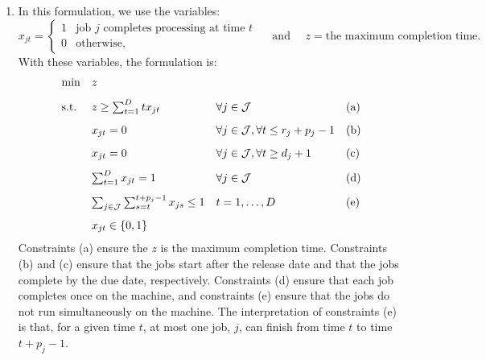 \documentclass[10pt]{article}
\begin{document}
\begin{enumerate}
\begin{enumerate}
  \item In this formulation, we use the variables:
    \[
    x_{jt} = \left\{
      \begin{array}{ll}
        1 & \mbox{job $j$ completes processing at time $t$} \\
        0 & \mbox{otherwise},
      \end{array}
      \right. \quad \mbox{ and } \quad z = \mbox{the maximum
        completion time}.
    \]
    With these variables, the formulation is:
    \[
    \begin{array}{llll}
      \min & z & & \\[3mm]
      \mbox{s.t.} & z \geq \sum_{t=1}^D t x_{jt} & \forall j \in {\cal J} &
      \mbox{(a)} \\[3mm]
      & x_{jt} = 0 & \forall j \in {\cal J}, \forall t \leq r_j + p_j - 1 &
      \mbox{(b)} \\[3mm]
      & x_{jt} = 0 & \forall j \in {\cal J}, \forall t \geq d_j + 1 &
      \mbox{(c)} \\[3mm]
      & \sum_{t=1}^D x_{jt} = 1 & \forall j \in {\cal J} & \mbox{(d)} \\[3mm]
      & \sum_{j \in {\cal J}} \sum_{s = t}^{t + p_j - 1} x_{js} \leq 1 & t
      = 1,\ldots,D & \mbox{(e)} \\[3mm]
      & x_{jt} \in \{0,1\}
    \end{array}
    \]
    Constraints (a) ensure the $z$ is the maximum completion
    time. Constraints (b) and (c) ensure that the jobs start after the
    release date and that the jobs complete by the due date,
    respectively.
    Constraints (d) ensure that each job completes once on the
    machine, and constraints (e) ensure that the jobs do not run
    simultaneously on the machine. The interpretation of constraints
    (e) is that, for a given time $t$, at most one job, $j$, can
    finish from time $t$ to time $t+p_j -1$.
  \end{enumerate}


\end{enumerate}
\end{document}

